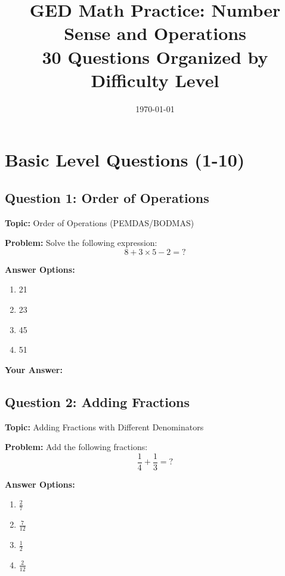 \documentclass[12pt]{article}
\title{\textbf{GED Math Practice: Number Sense and Operations}\\[0.5cm]{\large 30 Questions Organized by Difficulty Level}}
\author{}
\date{\today}
\begin{document}
\maketitle
\newpage

\tableofcontents
\newpage

\section{Basic Level Questions (1-10)}

\subsection{Question 1: Order of Operations}
\textbf{Topic:} Order of Operations (PEMDAS/BODMAS)

\textbf{Problem:} Solve the following expression:
\[8 + 3 \times 5 - 2 = ?\]

\textbf{Answer Options:}
\begin{enumerate}[label=\Alph*)]
    \item 21
    \item 23
    \item 45
    \item 51
\end{enumerate}

\noindent\textbf{Your Answer:} \underline{\hspace{2cm}}

\vspace{0.5cm}


\subsection{Question 2: Adding Fractions}
\textbf{Topic:} Adding Fractions with Different Denominators

\textbf{Problem:} Add the following fractions:
\[\frac{1}{4} + \frac{1}{3} = ?\]

\textbf{Answer Options:}
\begin{enumerate}[label=\Alph*)]
    \item $\frac{2}{7}$
    \item $\frac{7}{12}$
    \item $\frac{1}{2}$
    \item $\frac{2}{12}$
\end{enumerate}
\end{document}
